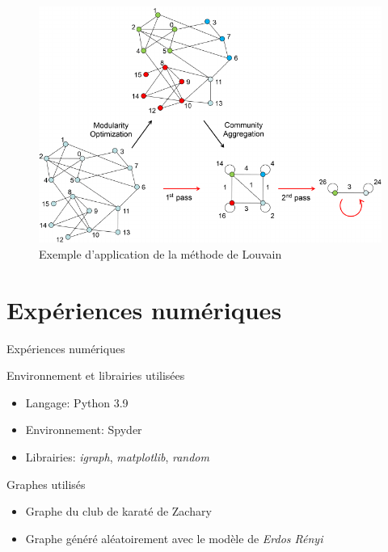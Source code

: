 \documentclass[11pt]{beamer}
\begin{document}
	\begin{frame}
		\begin{figure}[H]
			\centering
			\includegraphics[scale=0.29]{images/Louvain-algorithm-overview-Fig-1-in-10}
			\caption{Exemple d'application de la méthode de Louvain}
		\end{figure}
	\end{frame}
		
	
	\section{Expériences numériques}
	
	\begin{frame}{Expériences numériques}
		\begin{block}{Environnement et librairies utilisées}
			\begin{itemize}
				\item Langage: Python 3.9 \\
				\item Environnement: Spyder \\
				\item Librairies: \textit{igraph}, \textit{matplotlib}, \textit{random}
			\end{itemize} 
		\end{block}
		\begin{block}{Graphes utilisés}
			\begin{itemize}
				\item Graphe du club de karaté de Zachary \\
				\item Graphe généré aléatoirement avec le modèle de \textit{Erdos Rényi}
			\end{itemize}
		\end{block}
	\end{frame}
	
\end{document}
